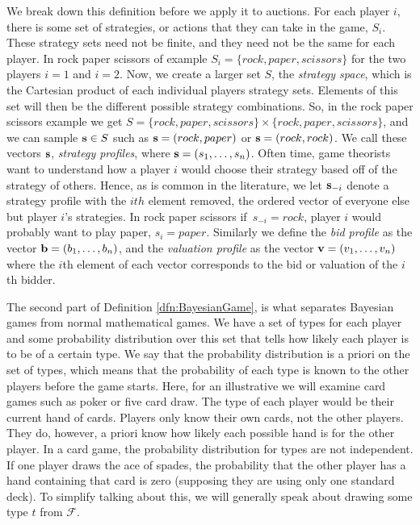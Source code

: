 \documentclass[12pt,twoside]{reedthesis}
\begin{document}
We break down this definition before we apply it to auctions. For each player $i$, there is some set of strategies, or actions that they can take in the game, $S_i$. These strategy sets need not be finite, and they need not be the same for each player. In rock paper scissors of example $S_i = \{rock, paper, scissors\}$ for the two players $i =1$ and $i = 2$. Now, we create a larger set $S$, the {\em strategy space}, which is the Cartesian product of each individual players strategy sets. Elements of this set will then be the different possible strategy combinations. So, in the rock paper scissors example we get $S = \{rock, paper, scissors\} \times \{rock, paper, scissors\}$, and we can sample $\textbf{s} \in S$ such as $\textbf{s} = (rock, paper)$ or $\textbf{s} = (rock, rock)$. We call these vectors $\textbf{s}$, {\em strategy profiles}, where $\textbf{s} = (s_1, \ldots, s_n)$. Often time, game theorists want to understand how a player $i$ would choose their strategy based off of the strategy of others. Hence, as is common in the literature, we let $\textbf{s}_{-i}$ denote a strategy profile with the $ith$ element removed, the ordered vector of everyone else but player $i$'s strategies. In rock paper scissors if~$s_{-i} = {rock}$, player $i$ would probably want to play paper, $s_i = paper$. Similarly we define the {\em bid profile} as the vector $\textbf{b} = (b_1, \ldots, b_n)$, and the {\em valuation profile} as the vector $\textbf{v} = (v_1, \ldots, v_n)$ where the $i$th element of each vector corresponds to the bid or valuation of the $i$th bidder.

The second part of Definition \ref{dfn:BayesianGame}, is what separates Bayesian games from normal mathematical games. We have a set of types for each player and some probability distribution over this set that tells how likely each player is to be of a certain type. We say that the probability distribution is a priori on the set of types, which means that the probability of each type is known to the other players before the game starts. Here, for an illustrative we will examine card games such as poker or five card draw. The type of each player would be their current hand of cards. Players only know their own cards, not the other players. They do, however, a priori know how likely each possible hand is for the other player. In a card game, the probability distribution for types are not independent. If one player draws the ace of spades, the probability that the other player has a hand containing that card is zero (supposing they are using only one standard deck). To simplify talking about this, we will generally speak about drawing some type $t$ from $\mathcal{F}$.
\end{document}
